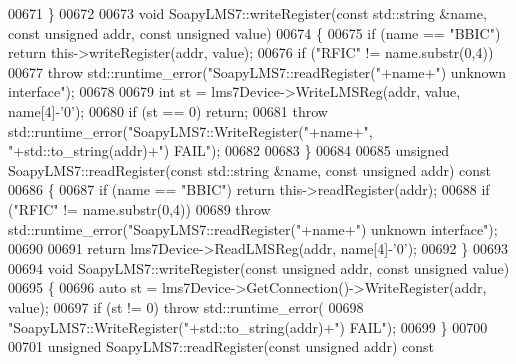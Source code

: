 \begin{DoxyCode}
{{{{{{{{{{{{{{00671 \}
00672 
00673 \textcolor{keywordtype}{void} SoapyLMS7::writeRegister(\textcolor{keyword}{const} std::string &name, \textcolor{keyword}{const} \textcolor{keywordtype}{unsigned} addr, \textcolor{keyword}{const} \textcolor{keywordtype}{unsigned} value)
00674 \{
00675     \textcolor{keywordflow}{if} (name == \textcolor{stringliteral}{"BBIC"}) \textcolor{keywordflow}{return} this->writeRegister(addr, value);
00676     \textcolor{keywordflow}{if} (\textcolor{stringliteral}{"RFIC"} != name.substr(0,4))
00677         \textcolor{keywordflow}{throw} std::runtime\_error(\textcolor{stringliteral}{"SoapyLMS7::readRegister("}+name+\textcolor{stringliteral}{") unknown interface"});
00678 
00679     \textcolor{keywordtype}{int} st = lms7Device->WriteLMSReg(addr, value, name[4]-\textcolor{charliteral}{'0'});
00680     \textcolor{keywordflow}{if} (st == 0) \textcolor{keywordflow}{return};
00681     \textcolor{keywordflow}{throw} std::runtime\_error(\textcolor{stringliteral}{"SoapyLMS7::WriteRegister("}+name+\textcolor{stringliteral}{", "}+std::to\_string(addr)+\textcolor{stringliteral}{") FAIL"});
00682 
00683 \}
00684 
00685 \textcolor{keywordtype}{unsigned} SoapyLMS7::readRegister(\textcolor{keyword}{const} std::string &name, \textcolor{keyword}{const} \textcolor{keywordtype}{unsigned} addr)\textcolor{keyword}{ const}
00686 \textcolor{keyword}{}\{
00687     \textcolor{keywordflow}{if} (name == \textcolor{stringliteral}{"BBIC"}) \textcolor{keywordflow}{return} this->readRegister(addr);
00688     \textcolor{keywordflow}{if} (\textcolor{stringliteral}{"RFIC"} != name.substr(0,4))
00689         \textcolor{keywordflow}{throw} std::runtime\_error(\textcolor{stringliteral}{"SoapyLMS7::readRegister("}+name+\textcolor{stringliteral}{") unknown interface"});
00690 
00691     \textcolor{keywordflow}{return} lms7Device->ReadLMSReg(addr, name[4]-\textcolor{charliteral}{'0'});
00692 \}
00693 
00694 \textcolor{keywordtype}{void} SoapyLMS7::writeRegister(\textcolor{keyword}{const} \textcolor{keywordtype}{unsigned} addr, \textcolor{keyword}{const} \textcolor{keywordtype}{unsigned} value)
00695 \{
00696     \textcolor{keyword}{auto} st = lms7Device->GetConnection()->WriteRegister(addr, value);
00697     \textcolor{keywordflow}{if} (st != 0) \textcolor{keywordflow}{throw} std::runtime\_error(
00698         \textcolor{stringliteral}{"SoapyLMS7::WriteRegister("}+std::to\_string(addr)+\textcolor{stringliteral}{") FAIL"});
00699 \}
00700 
00701 \textcolor{keywordtype}{unsigned} SoapyLMS7::readRegister(\textcolor{keyword}{const} \textcolor{keywordtype}{unsigned} addr)\textcolor{keyword}{ const}
}}}}}}}}}}}}}}
\end{DoxyCode}
